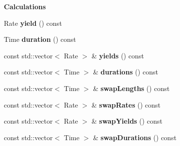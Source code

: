 \begin{Indent}{\bf Calculations}\par
\begin{DoxyCompactItemize}
\item 
Rate {\bfseries yield} () const \label{class_quant_lib_1_1_rendistato_calculator_a849dfe34954eea0266121339a77dafbb}

\item 
Time {\bfseries duration} () const \label{class_quant_lib_1_1_rendistato_calculator_ad15858294e9accaa9a570e5d496af742}

\item 
const std\+::vector$<$ Rate $>$ \& {\bfseries yields} () const \label{class_quant_lib_1_1_rendistato_calculator_a2f39877f108930b37b6e75a089e50792}

\item 
const std\+::vector$<$ Time $>$ \& {\bfseries durations} () const \label{class_quant_lib_1_1_rendistato_calculator_ad5bf27010acd091f8b65744393db8f0b}

\item 
const std\+::vector$<$ Time $>$ \& {\bfseries swap\+Lengths} () const \label{class_quant_lib_1_1_rendistato_calculator_aff0d85793f6b98de7e4a4479c9543724}

\item 
const std\+::vector$<$ Rate $>$ \& {\bfseries swap\+Rates} () const \label{class_quant_lib_1_1_rendistato_calculator_a57b387b3abcbf4bcf8e72195fd0bc6ca}

\item 
const std\+::vector$<$ Rate $>$ \& {\bfseries swap\+Yields} () const \label{class_quant_lib_1_1_rendistato_calculator_a498755a4d2da7923a88f0bc117f463a9}

\item 
const std\+::vector$<$ Time $>$ \& {\bfseries swap\+Durations} () const \label{class_quant_lib_1_1_rendistato_calculator_ab261451124f93c51c79f6e0d44bebe34}

\end{DoxyCompactItemize}
\end{Indent}
